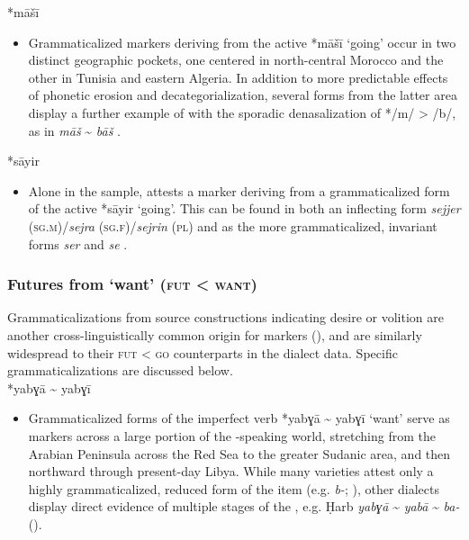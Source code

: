 \documentclass[output=paper]{langsci/langscibook}
\begin{document}
*māšī

\begin{itemize}

  \item[]
Grammaticalized  markers deriving from the active  *māšī ‘going’ occur in two distinct geographic pockets, one centered in north-central Morocco and the other in Tunisia and eastern Algeria. In addition to more predictable effects of phonetic erosion and decategorialization, several forms from the latter area display a further example of  with the sporadic denasalization of */m/ > /b/, as in  \textit{māš} {\textasciitilde} \textit{bāš} \citep{Talmoudi1980}.
\end{itemize}
 
*sāyir

\begin{itemize}

 \item[]
Alone in the sample,  attests a  marker deriving from a grammaticalized form of the active  *sāyir ‘going’. This can be found in both an inflecting form \textit{sejjer} (\textsc{sg.m})/\textit{sejra} (\textsc{sg.f})/\textit{sejrin} (\textsc{pl}) and as the more grammaticalized, invariant forms \textit{ser} and \textit{se} \citep{Vanhove1993}.
\end{itemize}

\subsubsection{ Futures from ‘want’ (\textsc{fut} < \textsc{want})}

Grammaticalizations from source constructions indicating desire or volition are another cross-linguistically common origin for   markers (\citealt{Bybee1994,HeineKuteva2002}), and are similarly widespread to their \textsc{fut} < \textsc{go} counterparts in the  dialect data. Specific grammaticalizations are discussed below.\\
 
*yabɣā {\textasciitilde} yabɣī 

\begin{itemize}

  \item[]
Grammaticalized forms of the imperfect verb *yabɣā {\textasciitilde} yabɣī ‘want’ serve as  markers across a large portion of the -speaking world, stretching from the Arabian Peninsula across the Red Sea to the greater Sudanic area, and then northward through present-day Libya. While many  varieties attest only a highly grammaticalized, reduced form of the item (e.g.  \textit{b-}; \citealt{Qafisheh1977}), other dialects display direct evidence of multiple stages of the , e.g. Ḥarb \textit{yabɣā} {\textasciitilde} \textit{yabā} {\textasciitilde} \textit{ba-} (\citealt{Il-Hazmy1975}).
\end{itemize}
 
\end{document}
